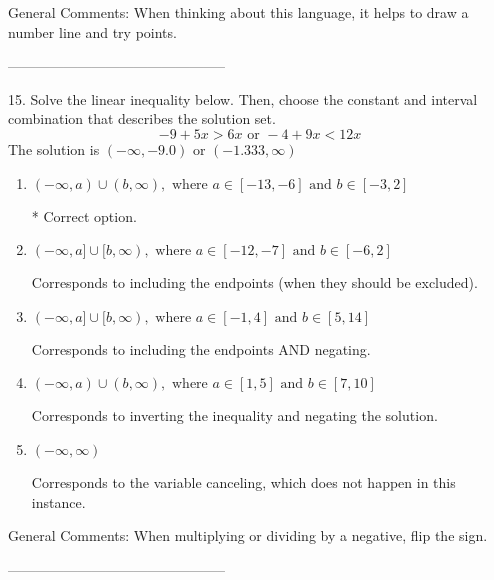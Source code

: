 \documentclass{article}[14pt]
\begin{document}
General Comments: When thinking about this language, it helps to draw a number line and try points.

-----------------------------------------------

15. Solve the linear inequality below. Then, choose the constant and interval combination that describes the solution set.
$$ -9 + 5 x > 6 x \text{ or } -4 + 9 x < 12 x $$ 
The solution is $ (-\infty, -9.0) \text{ or } (-1.333, \infty) $ 

\begin{enumerate}[label=\Alph*.] 
\item $ (-\infty, a) \cup (b, \infty), \text{ where } a \in [-13, -6] \text{ and } b \in [-3, 2] $ 

  * Correct option. 
\item $ (-\infty, a] \cup [b, \infty), \text{ where } a \in [-12, -7] \text{ and } b \in [-6, 2] $ 

 Corresponds to including the endpoints (when they should be excluded). 
\item $ (-\infty, a] \cup [b, \infty), \text{ where } a \in [-1, 4] \text{ and } b \in [5, 14] $ 

 Corresponds to including the endpoints AND negating. 
\item $ (-\infty, a) \cup (b, \infty), \text{ where } a \in [1, 5] \text{ and } b \in [7, 10] $ 

 Corresponds to inverting the inequality and negating the solution. 
\item $ (-\infty, \infty) $ 

 Corresponds to the variable canceling, which does not happen in this instance. 
\end{enumerate} 
 
General Comments: When multiplying or dividing by a negative, flip the sign.

-----------------------------------------------
\end{document}
